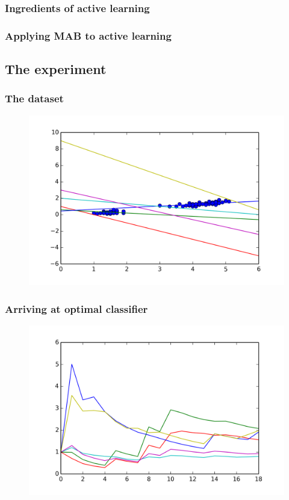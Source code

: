 \documentclass{beamer}
\begin{document}
  \begin{frame}
  \frametitle{Ingredients of active learning}
  \end{frame}

  \begin{frame}
  \frametitle{Applying MAB to active learning}
  \end{frame}
\subsection{The experiment}
  \begin{frame}
  \frametitle{The dataset}
    \begin{figure}
      \includegraphics[scale=.7]{graphics/gypothesis} 
    \end{figure}
  \end{frame}
  \begin{frame}
  \frametitle{Arriving at optimal classifier}
    \begin{figure}
      \includegraphics[scale=.7]{graphics/convergence15} 
    \end{figure}
  \end{frame}
\end{document}
